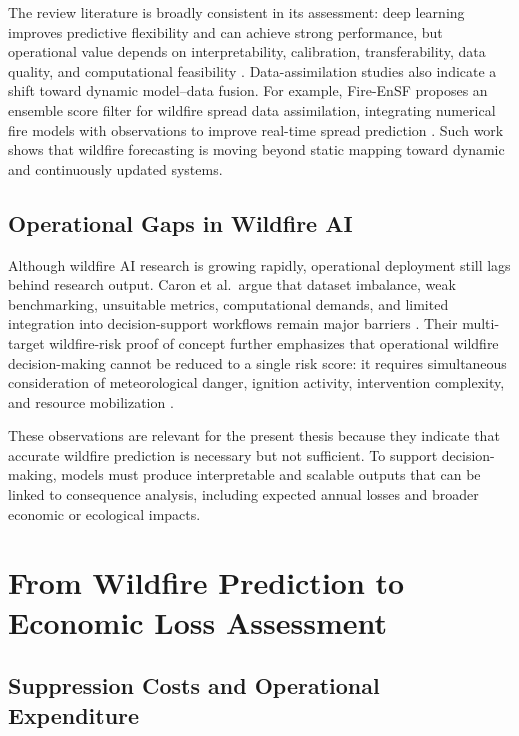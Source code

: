 The review literature is broadly consistent in its assessment: deep learning improves predictive flexibility and can achieve strong performance, but operational value depends on interpretability, calibration, transferability, data quality, and computational feasibility \citep{jodhani2026ai,liu2025advancements,caron2025ai}. Data-assimilation studies also indicate a shift toward dynamic model--data fusion. For example, Fire-EnSF proposes an ensemble score filter for wildfire spread data assimilation, integrating numerical fire models with observations to improve real-time spread prediction \citep{shi2025fireensf}. Such work shows that wildfire forecasting is moving beyond static mapping toward dynamic and continuously updated systems.

\subsection{Operational Gaps in Wildfire AI}

Although wildfire AI research is growing rapidly, operational deployment still lags behind research output. Caron et al.\ argue that dataset imbalance, weak benchmarking, unsuitable metrics, computational demands, and limited integration into decision-support workflows remain major barriers \citep{caron2025ai}. Their multi-target wildfire-risk proof of concept further emphasizes that operational wildfire decision-making cannot be reduced to a single risk score: it requires simultaneous consideration of meteorological danger, ignition activity, intervention complexity, and resource mobilization \citep{caron2026multitarget}.

These observations are relevant for the present thesis because they indicate that accurate wildfire prediction is necessary but not sufficient. To support decision-making, models must produce interpretable and scalable outputs that can be linked to consequence analysis, including expected annual losses and broader economic or ecological impacts.

\section{From Wildfire Prediction to Economic Loss Assessment}

\subsection{Suppression Costs and Operational Expenditure}

